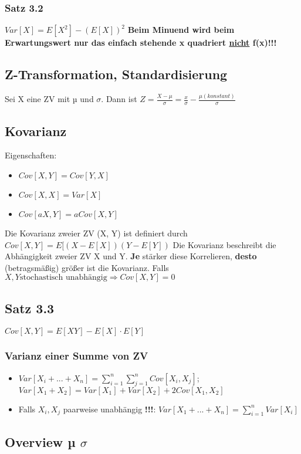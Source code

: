 \subsubsection{Satz 3.2}
$Var[X] = E[X^2] - (E[X])^2$ \textbf{Beim Minuend wird beim Erwartungswert nur das einfach stehende x quadriert \underline{nicht} f(x)!!!}
\subsection{Z-Transformation, Standardisierung}
Sei X eine ZV mit µ und $\sigma$. Dann ist $Z = \frac{X - \mu}{\sigma} = \frac{x}{\sigma} - \frac{\mu (konstant)}{\sigma}$ 
\subsection{Kovarianz}
Eigenschaften:
\begin{itemize}
	\item $Cov[X, Y] = Cov[Y,X]$
	\item $Cov[X, X] = Var[X]$
	\item $Cov[aX, Y] = a Cov[X,Y]$
\end{itemize}
Die Kovarianz zweier ZV (X, Y) ist definiert durch
$Cov[X, Y] = E[(X - E[X])(Y-E[Y])$
Die Kovarianz beschreibt die Abhängigkeit zweier ZV X und Y. \textbf{Je} stärker diese Korrelieren, \textbf{desto} (betragsmäßig) größer ist die Kovarianz. Falls $X, Y \text{stochastisch unabhängig} \Rightarrow Cov[X, Y] = 0$ 
\subsection{Satz 3.3}
$Cov[X, Y] = E[XY] - E[X] \cdot E[Y]$\\
\subsubsection{Varianz einer Summe von ZV}
\begin{itemize}
	\item $Var[X_{i} + ... + X_{n}] = \sum_{i=1}^{n} \sum_{j=1}^{n} Cov[X_{i}, X_{j}]$;
	$Var[X_{1} + X_{2}] = Var[X_{1}] + Var[X_{2}] + 2Cov[X_{1}, X_{2}]$
	\item Falls $X_{i} , X_{j}$ paarweise unabhängig \textbf{!!!}: $Var[X_{1} + ...+ X_{n}] = \sum_{i=1}^{n} Var[X_{i}]$
\end{itemize}
\subsection{Overview µ $\sigma$}